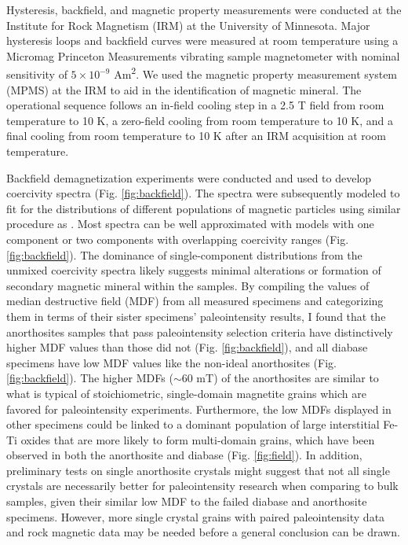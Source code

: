 \documentclass[draft]{agujournal2019}
\begin{document}
Hysteresis, backfield, and magnetic property measurements were conducted at the Institute for Rock Magnetism (IRM) at the University of Minnesota. Major hysteresis loops and backfield curves were measured at room temperature using a Micromag Princeton Measurements vibrating sample magnetometer with nominal sensitivity of $5 \times 10^{-9}$ Am\textsuperscript{2}. We used the magnetic property measurement system (MPMS) at the IRM to aid in the identification of magnetic mineral. The operational sequence follows an in-field cooling step in a 2.5 T field from room temperature to 10 K, a zero-field cooling from room temperature to 10 K, and a final cooling from room temperature to 10 K after an IRM acquisition at room temperature. 

Backfield demagnetization experiments were conducted and used to develop coercivity spectra (Fig. \ref{fig:backfield}). The spectra were subsequently modeled to fit for the distributions of different  populations of magnetic particles using similar procedure as \cite{Maxbauer2016a}. Most spectra can be well approximated with models with one component or two components with overlapping coercivity ranges (Fig. \ref{fig:backfield}). The dominance of single-component distributions from the unmixed coercivity spectra likely suggests minimal alterations or formation of secondary magnetic mineral within the samples. By compiling the values of median destructive field (MDF) from all measured specimens and categorizing them in terms of their sister specimens' paleointensity results, I found that the anorthosites samples that pass paleointensity selection criteria have distinctively higher MDF values than those did not (Fig. \ref{fig:backfield}), and all diabase specimens have low MDF values like the non-ideal anorthosites (Fig. \ref{fig:backfield}). The higher MDFs ($\sim$60 mT) of the anorthosites are similar to what is typical of stoichiometric, single-domain magnetite grains which are favored for paleointensity experiments. Furthermore, the low MDFs displayed in other specimens could be linked to a dominant population of large interstitial Fe-Ti oxides that are more likely to form multi-domain grains, which have been observed in both the anorthosite and diabase (Fig. \ref{fig:field}). In addition, preliminary tests on single anorthosite crystals might suggest that not all single crystals are necessarily better for paleointensity research when comparing to bulk samples, given their similar low MDF to the failed diabase and anorthosite specimens. However, more single crystal grains with paired paleointensity data and rock magnetic data may be needed before a general conclusion can be drawn. 
\end{document}
